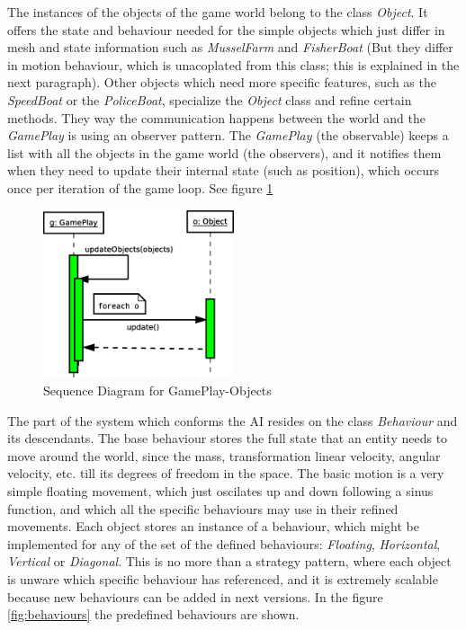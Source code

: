 \documentclass[]{article}
\begin{document}
The instances of the objects of the game world belong to the class \emph{Object}. It offers the state and behaviour needed for the simple objects which just differ in mesh and state information such as
\emph{MusselFarm} and \emph{FisherBoat} (But they differ in motion behaviour, which is unacoplated from this class; this is explained in the next paragraph). Other objects which need more specific features, such
as the \emph{SpeedBoat} or the \emph{PoliceBoat}, specialize the \emph{Object} class and refine certain methods. They way the communication happens between the world and the \emph{GamePlay} is using
an observer pattern. The \emph{GamePlay} (the observable) keeps a list with all the objects in the game world (the observers), and it notifies them when they need to update their internal state (such as position), 
which occurs once per iteration of the game loop. See figure \ref{fig:obsSeq} \\

\begin{figure}[!htb]
\begin{center}
\includegraphics[width=0.5\textwidth]{images/observerSequence.eps}
\caption{Sequence Diagram for GamePlay-Objects}
\label{fig:obsSeq}
\end{center}
\end{figure}

The part of the system which conforms the AI resides on the class \emph{Behaviour} and its descendants. The base behaviour stores the full state that an entity needs to move around the world, since the mass, transformation
linear velocity, angular velocity, etc. till its degrees of freedom in the space. The basic motion is a very simple floating movement, which just oscilates up and down following a sinus function, and which all
the specific behaviours may use in their refined  movements. Each object stores an instance of a behaviour, which might be implemented for any of the set of the defined behaviours: \emph{Floating}, 
\emph{Horizontal}, \emph{Vertical} or \emph{Diagonal}. This is no more than a strategy pattern, where each object
is unware which specific behaviour has referenced, and it is extremely scalable because new behaviours can be added in next versions. In the figure \ref{fig:behaviours} the predefined behaviours are shown.\\
\end{document}
